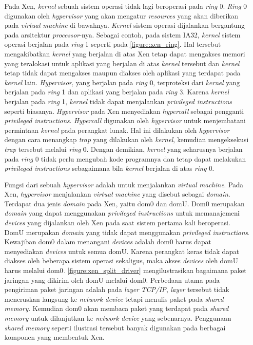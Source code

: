 Pada Xen, \textit{kernel} sebuah sistem operasi tidak lagi beroperasi pada \textit{ring} 0.
\textit{Ring} 0 digunakan oleh \textit{hypervisor} yang akan mengatur \textit{resources} yang
akan diberikan pada \textit{virtual machine} di bawahnya.  \textit{Kernel} sistem operasi
dijalankan bergantung pada arsitektur \textit{processor}-nya.  Sebagai contoh, pada sistem IA32,
\textit{kernel} sistem operasi berjalan pada \textit{ring} 1 seperti pada
\autoref{figure:xen_ring}.  Hal tersebut mengakibatkan \textit{kernel} yang berjalan di atas Xen
tetap dapat mengakses memori yang teralokasi untuk aplikasi yang berjalan di atas
\textit{kernel} tersebut dan \textit{kernel} tetap tidak dapat mengakses maupun diakses oleh
aplikasi yang terdapat pada \textit{kernel} lain.  \textit{Hypervisor}, yang berjalan pada
\textit{ring} 0, terproteksi dari \textit{kernel} yang berjalan pada \textit{ring} 1 dan
aplikasi yang berjalan pada \textit{ring} 3.  Karena \textit{kernel} berjalan pada \textit{ring}
1, \textit{kernel} tidak dapat menjalankan \textit{privileged instructions} seperti biasanya.
\textit{Hypervisor} pada Xen menyediakan \textit{hypercall} sebagai pengganti \textit{privileged
instructions}.  \textit{Hypercall} digunakan oleh \textit{hypervisor} untuk menjembatani
permintaan \textit{kernel} pada perangkat lunak. Hal ini dilakukan oleh \textit{hypervisor}
dengan cara menangkap \textit{trap} yang dilakukan oleh \textit{kernel}, kemudian mengeksekusi
\textit{trap} tersebut melalui \textit{ring} 0. Dengan demikian, \textit{kernel} yang seharusnya
berjalan pada \textit{ring} 0 tidak perlu mengubah kode programnya dan tetap dapat melakukan
\textit{privileged instructions} sebagaimana bila \textit{kernel} berjalan di atas \textit{ring}
0.

Fungsi dari sebuah \textit{hypervisor} adalah untuk menjalankan \textit{virtual machine}.  Pada
Xen, \textit{hypervisor} menjalankan \textit{virtual machine} yang disebut sebagai
\textit{domain}.  Terdapat dua jenis \textit{domain} pada Xen, yaitu dom0 dan domU.  Dom0
merupakan \textit{domain} yang dapat menggunakan \textit{privileged instructions} untuk
memanajemeni \textit{devices} yang dijalankan oleh Xen pada saat sistem pertama kali beroperasi.
DomU merupakan \textit{domain} yang tidak dapat menggunakan \textit{privileged instructions}.
Kewajiban dom0 dalam menangani \textit{devices} adalah dom0 harus dapat menyediakan
\textit{devices} untuk semua domU.  Karena perangkat keras tidak dapat diakses oleh beberapa
sistem operasi sekaligus, maka akses \textit{devices} oleh domU harus melalui dom0.
\autoref{figure:xen_split_driver} mengilustrasikan bagaimana paket jaringan yang dikirim oleh
domU melalui dom0.  Perbedaan utama pada pengiriman paket jaringan adalah pada \textit{layer}
\textit{TCP/IP}, \textit{layer} tersebut tidak meneruskan langsung ke \textit{network device}
tetapi menulis paket pada \textit{shared memory}.  Kemudian dom0 akan membaca paket yang
terdapat pada \textit{shared memory} untuk dilanjutkan ke \textit{network device} yang
sebenarnya.  Penggunaan \textit{shared memory} seperti ilustrasi tersebut banyak digunakan pada
berbagai komponen yang membentuk Xen.

